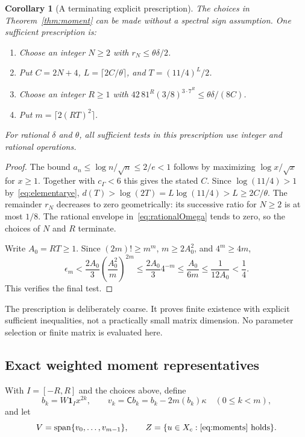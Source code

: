 \documentclass[11pt,a4paper]{article}
\numberwithin{equation}{section}
\newtheorem{corollary}[theorem]{Corollary}
\theoremstyle{remark}
\newcommand{\cg}{c_{\Gamma}}
\newcommand{\one}{\mathbf 1}
\begin{document}
\begin{corollary}[A terminating explicit prescription]\label{cor:choices}
The choices in Theorem~\ref{thm:moment} can be made without a spectral sign assumption. One sufficient prescription is:
\begin{enumerate}
\item Choose an integer $N\ge2$ with $r_N\le\theta\delta/2$.
\item Put $C=2N+4$, $L=\lceil2C/\theta\rceil$, and $T=(11/4)^L/2$.
\item Choose an integer $R\ge1$ with
$42\,81^R(3/8)^{3\cdot7^R}\le\theta\delta/(8C)$.
\item Put $m=\lceil2(RT)^2\rceil$.
\end{enumerate}
For rational $\delta$ and $\theta$, all sufficient tests in this prescription use integer and rational operations.
\end{corollary}
\begin{proof}
The bound $a_n\le\log n/\sqrt n\le2/e<1$ follows by maximizing $\log x/\sqrt x$ for $x\ge1$. Together with $\cg<6$ this gives the stated $C$. Since $\log(11/4)>1$ by~\eqref{eq:elementarye},
$d(T)>\log(2T)=L\log(11/4)>L\ge2C/\theta$.
The remainder $r_N$ decreases to zero geometrically: its successive ratio for $N\ge2$ is at most $1/8$. The rational envelope in~\eqref{eq:rationalOmega} tends to zero, so the choices of $N$ and $R$ terminate.

Write $A_0=RT\ge1$. Since $(2m)!\ge m^m$, $m\ge2A_0^2$, and $4^m\ge4m$,
\[
 \epsilon_m<\frac{2A_0}{3}\left(\frac{A_0^2}{m}\right)^{2m}
 \le\frac{2A_0}{3}4^{-m}
 \le\frac{A_0}{6m}\le\frac1{12A_0}<\frac14.
\]
This verifies the final test.
\end{proof}

The prescription is deliberately coarse. It proves finite existence with explicit sufficient inequalities, not a practically small matrix dimension. No parameter selection or finite matrix is evaluated here.

\subsection{Exact weighted moment representatives}

With $I=[-R,R]$ and the choices above, define
\begin{equation}\label{eq:momentbasis}
 b_k=W\one_Ix^{2k},\qquad
 v_k=\mathsf Cb_k=b_k-2m(b_k)\kappa\quad(0\le k<m),
\end{equation}
and let
\begin{equation}\label{eq:VZ}
 V=\operatorname{span}\{v_0,\ldots,v_{m-1}\},\qquad
 Z=\{u\in X_c:\text{\eqref{eq:moments} holds}\}.
\end{equation}
\end{document}
